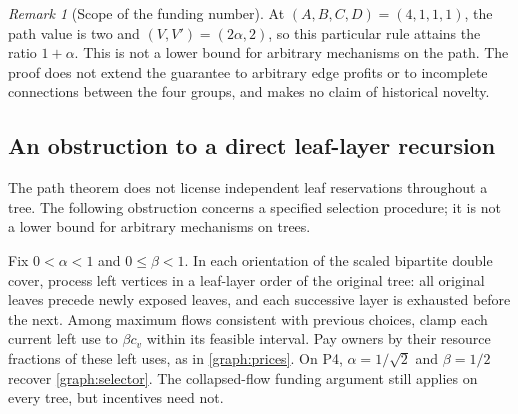 \documentclass[11pt]{article}
\theoremstyle{definition}\newtheorem{definition}[theorem]{Definition}
\theoremstyle{remark}\newtheorem{remark}[theorem]{Remark}
\begin{document}
\begin{remark}[Scope of the funding number]\label{graph:scope}
At $(A,B,C,D)=(4,1,1,1)$, the path value is two and
$(V,V')=(2\alpha,2)$, so this particular rule attains the ratio
$1+\alpha$. This is not a lower bound for arbitrary mechanisms on the
path. The proof does not extend the guarantee to arbitrary edge profits
or to incomplete connections between the four groups, and makes no
claim of historical novelty.
\end{remark}


\subsection{An obstruction to a direct leaf-layer recursion}
The path theorem does not license independent leaf reservations throughout a
tree. The following obstruction concerns a specified selection procedure;
it is not a lower bound for arbitrary mechanisms on trees.

Fix $0<\alpha<1$ and $0\le\beta<1$. In each orientation of the scaled
bipartite double cover, process left vertices in a leaf-layer order of the
original tree: all original leaves precede newly exposed leaves, and each
successive layer is exhausted before the next. Among maximum flows consistent
with previous choices, clamp each current left use to $\beta c_v$ within its
feasible interval. Pay owners by their resource fractions of these left uses,
as in \eqref{graph:prices}. On P4, $\alpha=1/\sqrt2$ and $\beta=1/2$
recover \eqref{graph:selector}. The collapsed-flow funding argument still
applies on every tree, but incentives need not.
\end{document}
